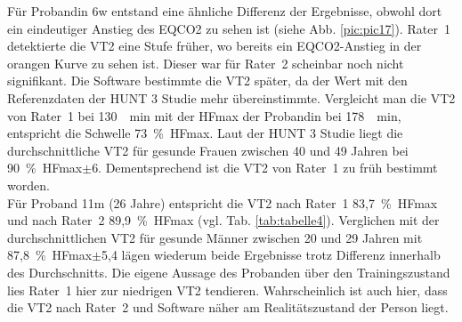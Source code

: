 Für Probandin 6w entstand eine ähnliche Differenz der Ergebnisse, obwohl dort ein eindeutiger Anstieg des \gls{EQCO2} zu sehen ist (siehe Abb. \ref{pic:pic17}). Rater~1 detektierte die VT2 eine Stufe früher, wo bereits ein \gls{EQCO2}-Anstieg in der orangen Kurve zu sehen ist. Dieser war für Rater~2 scheinbar noch nicht signifikant. Die Software bestimmte die VT2 später, da der Wert mit den Referenzdaten der HUNT 3 Studie mehr übereinstimmte. Vergleicht man die VT2 von Rater~1 bei \SI{130}{\per\minute} mit der \gls{HFmax} der Probandin bei \SI{178}{\per\minute}, entspricht die Schwelle 73~\%~\gls{HFmax}. Laut der HUNT 3 Studie liegt die durchschnittliche VT2 für gesunde Frauen zwischen 40 und 49 Jahren bei 90~\%~\gls{HFmax}$\pm$6. Dementsprechend ist die VT2 von Rater~1 zu früh bestimmt worden.\\
Für Proband 11m (26 Jahre) entspricht die VT2 nach Rater~1 83,7~\%~\gls{HFmax} und nach Rater~2 89,9~\%~\gls{HFmax} (vgl. Tab. \ref{tab:tabelle4}). Verglichen mit der durchschnittlichen VT2 für gesunde Männer zwischen 20 und 29 Jahren mit 87,8~\%~\gls{HFmax}$\pm$5,4 lägen wiederum beide Ergebnisse trotz Differenz innerhalb des Durchschnitts. Die eigene Aussage des Probanden über den Trainingszustand lies Rater~1 hier zur niedrigen VT2 tendieren. Wahrscheinlich ist auch hier, dass die VT2 nach Rater~2 und Software näher am Realitätszustand der Person liegt.
%
